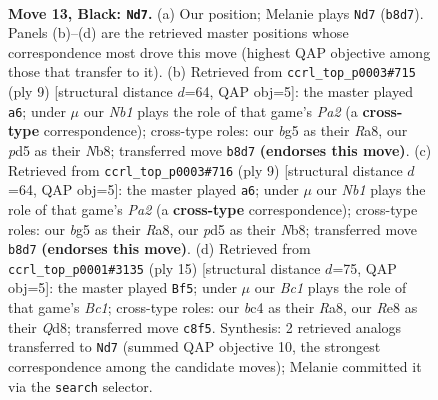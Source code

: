 \documentclass[11pt]{article}
\begin{document}
\clearpage

\begin{figure}[p]\centering
\begin{subfigure}{0.46\textwidth}\centering
\resizebox{\linewidth}{!}{%
\newchessgame
\chessboard[
  setfen={rnb1r1k1/ppq2pbp/6p1/2pPp1B1/2B1P3/2P5/P4PPP/R1Q2KNR b - - 3 13},
  showmover=false,
  pgfstyle=straightmove, color=movearrow, markmove={b8-d7}
]}
\caption{}
\end{subfigure}\hfill
\begin{subfigure}{0.46\textwidth}\centering
\resizebox{\linewidth}{!}{%
\newchessgame
\chessboard[
  setfen={rnbqkbnr/pp2pp1p/6p1/3pP3/3P4/8/PP3PPP/RNBQKBNR b KQkq - 0 5},
  showmover=false,
  pgfstyle=straightmove, color=movearrow, markmove={a7-a6}
]}
\caption{}
\end{subfigure}
\\[4pt]
\begin{subfigure}{0.46\textwidth}\centering
\resizebox{\linewidth}{!}{%
\newchessgame
\chessboard[
  setfen={rnbqkbnr/pp2pp1p/6p1/3pP3/3P4/8/PP3PPP/RNBQKBNR b KQkq - 0 5},
  showmover=false,
  pgfstyle=straightmove, color=movearrow, markmove={a7-a6}
]}
\caption{}
\end{subfigure}\hfill
\begin{subfigure}{0.46\textwidth}\centering
\resizebox{\linewidth}{!}{%
\newchessgame
\chessboard[
  setfen={r1bqkb1r/pp2pppp/2p5/3nP3/3P4/8/PPP1B1PP/RNBQK2R b KQkq - 0 8},
  showmover=false,
  pgfstyle=straightmove, color=movearrow, markmove={c8-f5}
]}
\caption{}
\end{subfigure}
\caption{\textbf{Move 13, Black: \texttt{Nd7}.} (a) Our position; Melanie plays \texttt{Nd7} (\texttt{b8d7}). Panels (b)--(d) are the retrieved master positions whose correspondence most drove this move (highest QAP objective among those that transfer to it). (b) Retrieved from \texttt{ccrl\_top\_p0003\#715} (ply 9) [structural distance $d$=64, QAP obj=5]: the master played \texttt{a6}; under $\mu$ our \emph{Nb1} plays the role of that game's \emph{Pa2} (a \textbf{cross-type} correspondence); cross-type roles: our \emph{b}g5 as their \emph{R}a8, our \emph{p}d5 as their \emph{N}b8; transferred move \texttt{b8d7} \textbf{(endorses this move)}. (c) Retrieved from \texttt{ccrl\_top\_p0003\#716} (ply 9) [structural distance $d$=64, QAP obj=5]: the master played \texttt{a6}; under $\mu$ our \emph{Nb1} plays the role of that game's \emph{Pa2} (a \textbf{cross-type} correspondence); cross-type roles: our \emph{b}g5 as their \emph{R}a8, our \emph{p}d5 as their \emph{N}b8; transferred move \texttt{b8d7} \textbf{(endorses this move)}. (d) Retrieved from \texttt{ccrl\_top\_p0001\#3135} (ply 15) [structural distance $d$=75, QAP obj=5]: the master played \texttt{Bf5}; under $\mu$ our \emph{Bc1} plays the role of that game's \emph{Bc1}; cross-type roles: our \emph{b}c4 as their \emph{R}a8, our \emph{R}e8 as their \emph{Q}d8; transferred move \texttt{c8f5}. Synthesis: 2 retrieved analogs transferred to \texttt{Nd7} (summed QAP objective 10, the strongest correspondence among the candidate moves); Melanie committed it via the \texttt{search} selector.}
\label{fig:thought-m25}
\end{figure}
\end{document}
